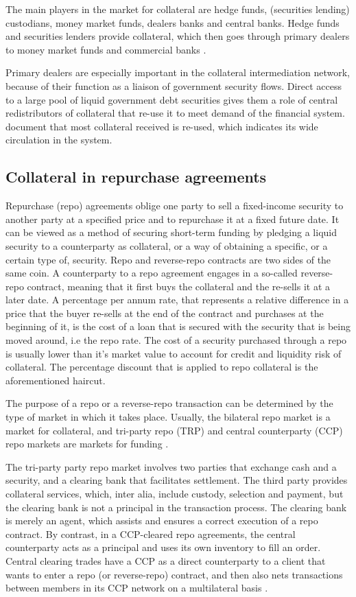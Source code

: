 \documentclass[11pt,a4paper,english,oneside]{article}
\begin{document}
The main players in the market for collateral are hedge funds, (securities lending) custodians, money market funds, dealers banks and central banks. Hedge funds and securities lenders provide collateral, which then goes through primary dealers to money market funds and commercial banks \citep{singh2017}.

Primary dealers are especially important in the collateral intermediation network, because of their function as a liaison of government security flows. Direct access to a large pool of liquid government debt securities gives them a role of central redistributors of collateral that re-use it to meet demand of the financial system. \citet{infante2020} document that most collateral received is re-used, which indicates its wide circulation in the system.

\subsection{Collateral in repurchase agreements}

Repurchase (repo) agreements oblige one party to sell a fixed-income security to another party at a specified price and to repurchase it at a fixed future date. It can be viewed as a method of securing short-term funding by pledging a liquid security to a counterparty as collateral, or a way of obtaining a specific, or a certain type of, security. Repo and reverse-repo contracts are two sides of the same coin. A counterparty to a repo agreement engages in a so-called reverse-repo contract, meaning that it first buys the collateral and the re-sells it at a later date. A percentage per annum rate, that represents a relative difference in a price that the buyer re-sells at the end of the contract and purchases at the beginning of it, is the cost of a loan that is secured with the security that is being moved around, i.e the repo rate. The cost of a security purchased through a repo is usually lower than it's market value to account for credit and liquidity risk of collateral. The percentage discount that is applied to repo collateral is the aforementioned haircut.

The purpose of a repo or a reverse-repo transaction can be determined by the type of market in which it takes place. Usually, the bilateral repo market is a market for collateral, and tri-party repo (TRP) and central counterparty (CCP) repo markets are markets for funding \citep{singh2020}.

The tri-party party repo market involves two parties that exchange cash and a security, and a clearing bank that facilitates settlement. The third party provides collateral services, which, inter alia, include custody, selection and payment, but the clearing bank is not a principal in the transaction process. The clearing bank is merely an agent, which assists and ensures a correct execution of a repo contract. By contrast, in a CCP-cleared repo agreements, the central counterparty acts as a principal and uses its own inventory to fill an order. Central clearing trades have a CCP as a direct counterparty to a client that wants to enter a repo (or reverse-repo) contract, and then also nets transactions between members in its CCP network on a multilateral basis \citep{aguiar2016}.
\end{document}
